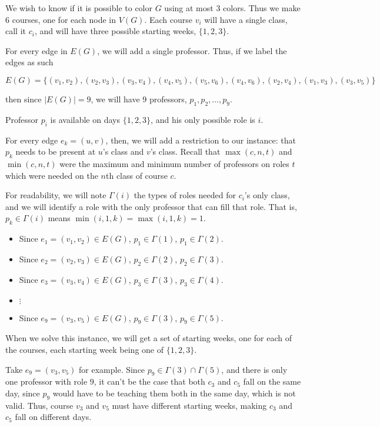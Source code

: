 We wish to know if it is possible to color $G$ using at most $3$ colors. Thus we make $6$ courses, one for each node in $V(G)$. Each course $v_i$ will have a single class, call it $c_i$, and will have three possible starting weeks, $\{1, 2, 3\}$.

For every edge in $E(G)$, we will add a single professor. Thus, if we label the edges as such

$$
E(G) = \{(v_1, v_2), (v_2, v_3), (v_3, v_4), (v_4, v_5), (v_5, v_6), (v_4, v_6), (v_2, v_4), (v_1, v_3), (v_3, v_5)\}
$$

\noindent then since $|E(G)| = 9$, we will have $9$ professors, $p_1, p_2, \dots, p_9$.

Professor $p_i$ is available on days $\{1, 2, 3\}$, and his only possible role is $i$.

For every edge $e_k = (u, v)$, then, we will add a restriction to our instance: that $p_k$ needs to be present at $u$'s class and $v$'s class. Recall that $\max(c, n, t)$ and $\min(c, n, t)$ were the maximum and minimum number of professors on roles $t$ which were needed on the $n$th class of course $c$.

For readability, we will note $\Gamma(i)$ the types of roles needed for $c_i$'s only class, and we will identify a role with the only professor that can fill that role. That is, $p_k \in \Gamma(i)$ means $\min(i, 1, k) = \max(i, 1, k) = 1$.

\newcommand{\restrict}[3]{\item Since $e_#3 = (v_#1, v_#2) \in E(G)$, $p_#3 \in \Gamma(#1)$, $p_#3 \in \Gamma(#2)$.}

\begin{itemize}
\restrict{1}{2}{1}
\restrict{2}{3}{2}
\restrict{3}{4}{3}
\item $\vdots$
\restrict{3}{5}{9}
\end{itemize}

When we solve this instance, we will get a set of starting weeks, one for each of the courses, each starting week being one of $\{1, 2, 3\}$.

Take $e_9 = (v_3, v_5)$ for example. Since $p_9 \in \Gamma(3) \cap \Gamma(5)$, and there is only one professor with role $9$, it can't be the case that both $c_3$ and $c_5$ fall on the same day, since $p_9$ would have to be teaching them both in the same day, which is not valid. Thus, course $v_3$ and $v_5$ must have different starting weeks, making $c_3$ and $c_5$ fall on different days.

